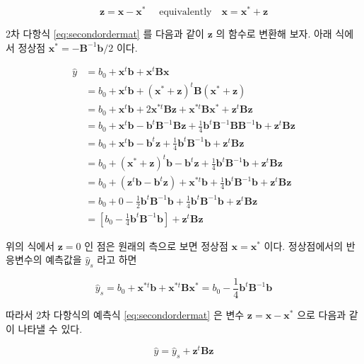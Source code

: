 \documentclass[
]{book}
\newcommand{\bm}[1]{\boldsymbol{\mathbf{#1}}}
\theoremstyle{definition}
\theoremstyle{definition}
\theoremstyle{definition}
\theoremstyle{definition}
\theoremstyle{remark}
\begin{document}
\[ \bm z = \bm x - {\bm x}^* \quad \text{ equivalently} \quad  \bm x =  {\bm x}^* + \bm z \]

2차 다항식 \eqref{eq:secondordermat} 를 다음과 같이 \(\bm z\) 의 함수로 변환해 보자. 아래 식에서 정상점 \({\bm x}^* = -{\bm B}^{-1} \bm b/2\) 이다.

\begin{align*}
\hat y  & =   b_0 + {\bm x}^t \bm b + {\bm x}^t \bm B {\bm x}  \\
  & =  b_0  + {\bm x}^t \bm b +  ({\bm x}^* + \bm z )^t \bm B ({\bm x}^* + \bm z ) \\
  & =  b_0  + {\bm x}^t \bm b + 2 {\bm x}^{*t}  \bm B  \bm z  + {\bm x}^{*t}  \bm B {\bm x}^{*} +  {\bm z}^t \bm B  {\bm z} \\
   & =  b_0  + {\bm x}^t \bm b - {\bm b}^t  {\bm B}^{-1}  \bm B  \bm z  +\frac{1}{4} {\bm b}^t  {\bm B}^{-1} \bm B {\bm B}^{-1} {\bm b} +  {\bm z}^t \bm B  {\bm z} \\
   & = b_0  + {\bm x}^t \bm b  - {\bm b}^t  \bm z +\frac{1}{4}  {\bm b}^t {\bm B}^{-1}{\bm b} +  {\bm z}^t \bm B  {\bm z} \\
   & = b_0  + ({\bm x}^* + \bm z)^t \bm b  - {\bm b}^t  \bm z +\frac{1}{4}  {\bm b}^t {\bm B}^{-1}{\bm b} +  {\bm z}^t \bm B  {\bm z} \\
   & = b_0 + ( {\bm z}^t \bm b - {\bm b}^t  \bm z) + {\bm x}^{*t} \bm b  +\frac{1}{4}  {\bm b}^t {\bm B}^{-1}{\bm b} +  {\bm z}^t \bm B  {\bm z} \\
  & = b_0 + 0  - \frac{1}{2}   {\bm b}^t  {\bm B}^{-1}{\bm b} +\frac{1}{4}  {\bm b}^t {\bm B}^{-1}{\bm b} +  {\bm z}^t \bm B  {\bm z} \\
  & =  \left [ b_0 - \frac{1}{4} {\bm b}^t {\bm B}^{-1}{\bm b}  \right ] +  {\bm z}^t \bm B  {\bm z} 
\label{eq:statval}
\end{align*}

위의 식에서 \(\bm z= 0\) 인 점은 원래의 측으로 보면 정상점 \(\bm x ={\bm x}^*\) 이다. 정상점에서의 반응변수의 예측값을 \(\hat y_s\) 라고 하면

\[ \hat y_s =   b_0 + {\bm x}^{*t} \bm b + {\bm x}^{*t} \bm B {\bm x}^* =  b_0 - \frac{1}{4} {\bm b}^t {\bm B}^{-1}{\bm b} \]

따라서 2차 다항식의 예측식 \eqref{eq:secondordermat} 은 변수 \(\bm z = \bm x - {\bm x}^*\) 으로 다음과 같이 나타낼 수 있다.

\begin{equation}
\hat y = \hat y_s +   {\bm z}^t \bm B  {\bm z} 
\label{eq:secondorderpred}
\end{equation}
\end{document}
